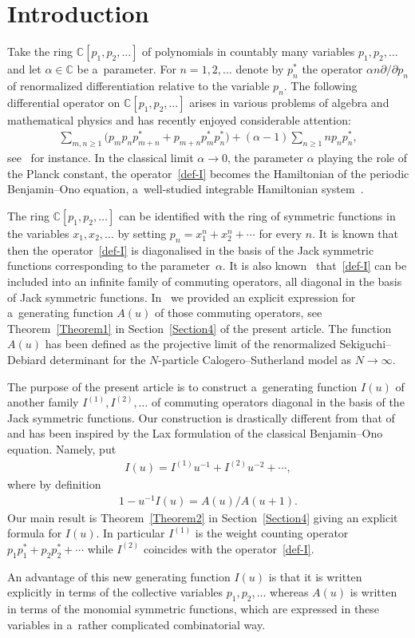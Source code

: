 \section{Introduction}

Take the ring $\mathbb C[p_1,p_2,\ldots]$ of polynomials in countably many variables $p_1, p_2,\ldots$ and
let $\alpha\in\mathbb C$ be a~parameter.
For $n=1,2,\ldots$ denote by $p_n^{\ast}$ the operator
$\alpha n\partial/\partial p_n$ of renormalized dif\/ferentiation relative to the
variable $p_n$.
The following dif\/ferential operator on $\mathbb C[p_1,p_2,\ldots]$ arises in various problems of
algebra and mathematical physics and has recently enjoyed considerable attention:
\begin{gather}
\label{def-I}
\sum_{m,n\ge1}\big(p_mp_np_{m+n}^{\ast}+p_{m+n}p_m^{\ast}p_n^{\ast}\big)+(\alpha-1)\sum_{n\ge1}np_np_n^{\ast},
\end{gather}
see~\cite{AMOS,CJ,NS1,OP,Pol} for instance.
In the classical limit $\alpha\rightarrow0$, the parameter $\alpha$ playing the role of the Planck
constant, the operator~\eqref{def-I} becomes the Hamiltonian of the periodic Benjamin--Ono equation,
a~well-studied integrable Hamiltonian system~\cite{AFSS,B,KLM,KM,O}.

The ring $\mathbb C[p_1,p_2,\ldots]$ can be identif\/ied with the ring of symmetric functions in the
variables $x_1,x_2,\ldots$ by setting $p_n=x_1^{ n}+x_2^{ n}+\cdots$ for
every $n$.
It is known that then the operator~\eqref{def-I} is diagonalised in the basis of the Jack symmetric
functions corresponding to the parameter~$\alpha$.
It is also known~\cite{SV} that~\eqref{def-I} can be included into an inf\/inite family of commuting
operators, all diagonal in the basis of Jack symmetric functions.
In~\cite{NS1} we provided an explicit expression for a~generating function $A(u)$ of those commuting
operators, see Theorem~\ref{Theorem1} in Section~\ref{Section4} of the present article.
The function $A(u)$ has been def\/ined as the projective limit of the renormalized Sekiguchi--Debiard
determinant for the $N$-particle Calogero--Sutherland model as $N\rightarrow\infty$.

The purpose of the present article is to construct a~generating function $I(u)$ of another family
$I^{(1)},I^{(2)},\ldots$ of commuting operators diagonal in the basis of
the Jack symmetric functions.
Our construction is drastically dif\/ferent from that of~\cite{NS1} and has been inspired by the Lax
formulation of the classical Benjamin--Ono equation.
Namely, put
\begin{gather}
\label{iu}
I(u)=I^{(1)}u^{-1}+I^{(2)}u^{-2}+\cdots,
\end{gather}
where by def\/inition
\begin{gather}
\label{hdef}
1-u^{-1}I(u)=A(u)/A(u+1).
\end{gather}
Our main result is Theorem~\ref{Theorem2} in Section~\ref{Section4} giving an explicit formula for $I(u)$.
In particular $I^{(1)}$ is the weight counting operator
$p_1p_1^{\ast}+p_2p_2^{\ast}+\cdots$ while $I^{(2)}$
coincides with the operator~\eqref{def-I}.

An advantage of this new generating function $I(u)$ is that it is written explicitly in terms of the
collective variables $p_1,p_2,\ldots$ whereas $A(u)$ is written in terms of the monomial symmetric
functions, which are expressed in these variables in a~rather complicated combinatorial way.

